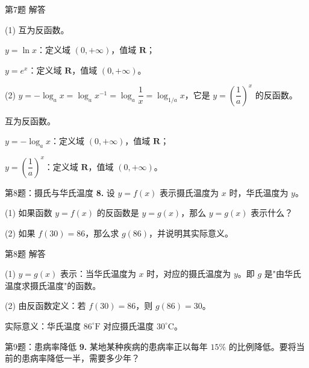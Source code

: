 \documentclass[10pt,aspectratio=169,serif]{beamer}
\begin{document}
\begin{frame}[t]{第7题 解答}
\begin{tcolorbox}[colback=orange!10,colframe=orange,title=\textbf{解}]
(1) \alert{互为反函数}。

\hspace{2em}$y=\ln x$：定义域 $(0,+\infty)$，值域 $\mathbf{R}$；

\hspace{2em}$y=e^x$：定义域 $\mathbf{R}$，值域 $(0,+\infty)$。

(2) $y=-\log_a x = \log_a x^{-1} = \log_a\dfrac{1}{x} = \log_{1/a} x$，它是 $y=\left(\dfrac{1}{a}\right)^x$ 的反函数。

\hspace{2em}\alert{互为反函数}。

\hspace{2em}$y=-\log_a x$：定义域 $(0,+\infty)$，值域 $\mathbf{R}$；

\hspace{2em}$y=\left(\dfrac{1}{a}\right)^x$：定义域 $\mathbf{R}$，值域 $(0,+\infty)$。
\end{tcolorbox}
\end{frame}

\begin{frame}[t]{第8题：摄氏与华氏温度}
\textbf{8.} 设 $y=f(x)$ 表示摄氏温度为 $x$ 时，华氏温度为 $y$。

\vspace{0.5em}
(1) 如果函数 $y=f(x)$ 的反函数是 $y=g(x)$，那么 $y=g(x)$ 表示什么？

(2) 如果 $f(30)=86$，那么求 $g(86)$，并说明其实际意义。
\end{frame}

\begin{frame}[t]{第8题 解答}
\begin{tcolorbox}[colback=orange!10,colframe=orange,title=\textbf{解}]
(1) $y=g(x)$ 表示：当华氏温度为 $x$ 时，对应的摄氏温度为 $y$。即 $g$ 是"由华氏温度求摄氏温度"的函数。

(2) 由反函数定义：若 $f(30)=86$，则 $g(86)=30$。

\hspace{2em}实际意义：华氏温度 $86^\circ\text{F}$ 对应摄氏温度 $30^\circ\text{C}$。
\end{tcolorbox}
\end{frame}

\begin{frame}[t]{第9题：患病率降低}
\textbf{9.} 某地某种疾病的患病率正以每年 $15\%$ 的比例降低。要将当前的患病率降低一半，需要多少年？
\end{frame}
\end{document}
